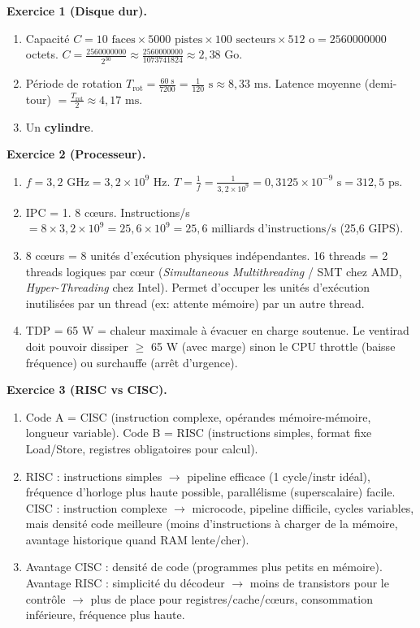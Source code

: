 \documentclass[11pt]{article}
\begin{document}
\begin{corrige}
\textbf{Exercice 1 (Disque dur).}
\begin{enumerate}
\item Capacité $C = 10 \text{ faces} \times 5000 \text{ pistes} \times 100 \text{ secteurs} \times 512 \text{ o} = \num{2560000000}$ octets.
$C = \frac{\num{2560000000}}{2^{30}} \approx \frac{\num{2560000000}}{\num{1073741824}} \approx 2,38 \text{ Go}$.
\item Période de rotation $T_{\text{rot}} = \frac{60 \text{ s}}{7200} = \frac{1}{120} \text{ s} \approx 8,33 \text{ ms}$.
Latence moyenne (demi-tour) $= \frac{T_{\text{rot}}}{2} \approx 4,17 \text{ ms}$.
\item Un \textbf{cylindre}.
\end{enumerate}

\textbf{Exercice 2 (Processeur).}
\begin{enumerate}
\item $f = 3,2 \text{ GHz} = 3,2 \times 10^9 \text{ Hz}$. $T = \frac{1}{f} = \frac{1}{3,2 \times 10^9} = 0,3125 \times 10^{-9} \text{ s} = 312,5 \text{ ps}$.
\item IPC = 1. 8 cœurs. Instructions/s $= 8 \times 3,2 \times 10^9 = 25,6 \times 10^9 = 25,6 \text{ milliards d'instructions/s}$ (25,6 GIPS).
\item 8 cœurs = 8 unités d'exécution physiques indépendantes. 16 threads = 2 threads logiques par cœur (\emph{Simultaneous Multithreading} / SMT chez AMD, \emph{Hyper-Threading} chez Intel). Permet d'occuper les unités d'exécution inutilisées par un thread (ex: attente mémoire) par un autre thread.
\item TDP = 65 W = chaleur maximale à évacuer en charge soutenue. Le ventirad doit pouvoir dissiper $\ge$ 65 W (avec marge) sinon le CPU throttle (baisse fréquence) ou surchauffe (arrêt d'urgence).
\end{enumerate}

\textbf{Exercice 3 (RISC vs CISC).}
\begin{enumerate}
\item Code A = CISC (instruction complexe, opérandes mémoire-mémoire, longueur variable). Code B = RISC (instructions simples, format fixe Load/Store, registres obligatoires pour calcul).
\item RISC : instructions simples $\to$ pipeline efficace (1 cycle/instr idéal), fréquence d'horloge plus haute possible, parallélisme (superscalaire) facile. CISC : instruction complexe $\to$ microcode, pipeline difficile, cycles variables, mais densité code meilleure (moins d'instructions à charger de la mémoire, avantage historique quand RAM lente/cher).
\item Avantage CISC : densité de code (programmes plus petits en mémoire). Avantage RISC : simplicité du décodeur $\to$ moins de transistors pour le contrôle $\to$ plus de place pour registres/cache/cœurs, consommation inférieure, fréquence plus haute.
\end{enumerate}
\end{corrige}
\end{document}
